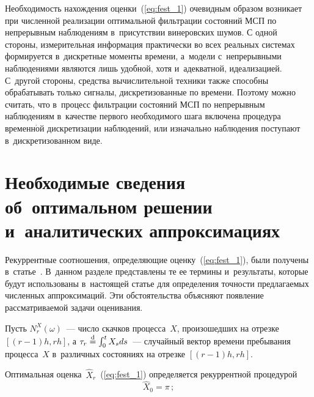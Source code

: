 \begin{multicols}{2}
Необходимость нахождения оценки~(\ref{eq:fest_1}) очевидным образом возникает 
при численной реализации оптимальной фильтрации состояний МСП по непрерывным 
наблюдениям в~присутствии винеровских шумов. 
С одной стороны, измерительная информация практически во всех реальных 
системах формируется в~дискретные моменты времени, а~модели с~непрерывными 
наблюдениями являются лишь удобной, хотя и~адекватной, идеализацией. 
С~другой стороны, средства вычислительной техники также способны обрабатывать 
только сигналы, дискретизованные по времени. Поэтому можно считать, что в~процесс 
фильтрации состояний МСП по непрерывным наблюдениям в~качестве первого необходимого 
шага включена процедура временн$\acute{\mbox{о}}$й 
дискретизации наблюдений, или изначально наблюдения поступают в~дискретизованном виде.


 \section{Необходимые сведения об~оптимальном решении и~аналитических аппроксимациях}
 
 
 Рекуррентные соотношения, определяющие оценку~(\ref{eq:fest_1}), были 
 получены в~статье~\cite{B_18_IA}. В~данном разделе представлены те ее 
 термины и~результаты, которые будут использованы в~настоящей статье 
 для определения точности предлагаемых численных аппроксимаций. 
 Эти обстоятельства объясняют появление рассматриваемой задачи оце\-ни\-вания.
 {
 
 }
 
  
   Пусть $N_r^X(\omega)$~--- число скачков процесса~$X$, произошедших на отрезке 
   $[(r-1)h,rh]$, а $\tau_r \stackrel{\mathrm{d}}{=} \int\nolimits_0^t X_sds$~--- 
   случайный вектор времени пребывания процесса~$X$ в~различных состояниях на 
   отрезке $[(r-1)h,rh]$.
  
  Оптимальная оценка~$\widehat{X}_r$~(\ref{eq:fest_1}) 
  определяется рекуррентной процедурой~\cite{B_18_IA}
  \begin{equation*}
  \widehat{X}_0 = \pi\,;
  \end{equation*}
  
 

\end{multicols}

